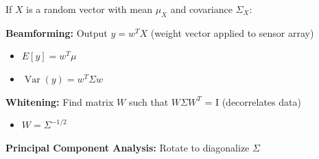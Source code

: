 

If $X$ is a random vector with mean $\mu_{X}$ and covariance $\Sigma_{X}$:



\textbf{Beamforming:} Output $y = w^{T}X$ (weight vector applied to sensor array)

\begin{itemize}
\tightlist
\item
  $E[y] = w^{T}\mu$
\item
  $\operatorname{Var}(y) = w^{T}\Sigma w$
\end{itemize}

\textbf{Whitening:} Find matrix $W$ such that $W\Sigma W^{T}$ = I (decorrelates data)

\begin{itemize}
\tightlist
\item
  $W = \Sigma^{-1/2}$
\end{itemize}

\textbf{Principal Component Analysis:} Rotate to diagonalize $\Sigma$


